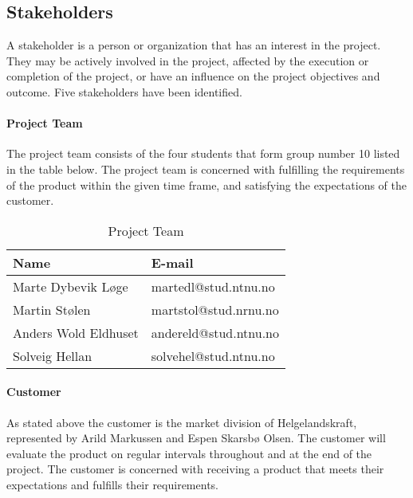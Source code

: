 \subsection{Stakeholders}

A stakeholder is a person or organization that has an interest in the project. They may be actively involved in the project, affected by the execution or completion of the project, or have an influence on the project objectives and outcome. Five stakeholders have been identified.

\paragraph{Project Team}

The project team consists of the four students that form group number 10 listed in the table below. The project team is concerned with fulfilling the requirements of the product within the given time frame, and satisfying the expectations of the customer.

\begin{table}
\begin{center}
    \begin{tabular}{| l | l |}
   	\hline
    {\bf Name} & {\bf E-mail} \\ \hline \hline
    Marte Dybevik Løge & martedl@stud.ntnu.no \\ \hline
    Martin Stølen & martstol@stud.nrnu.no \\ \hline
    Anders Wold Eldhuset & andereld@stud.ntnu.no \\ \hline
    Solveig Hellan & solvehel@stud.ntnu.no \\ 
    \hline
    \end{tabular}
\end{center}

\caption{Project Team}
\end{table}

\paragraph{Customer}

As stated above the customer is the market division of Helgelandskraft, represented by Arild Markussen and Espen Skarsbø Olsen. The customer will evaluate the product on regular intervals throughout and at the end of the project. The customer is concerned with receiving a product that meets their expectations and fulfills their requirements.

